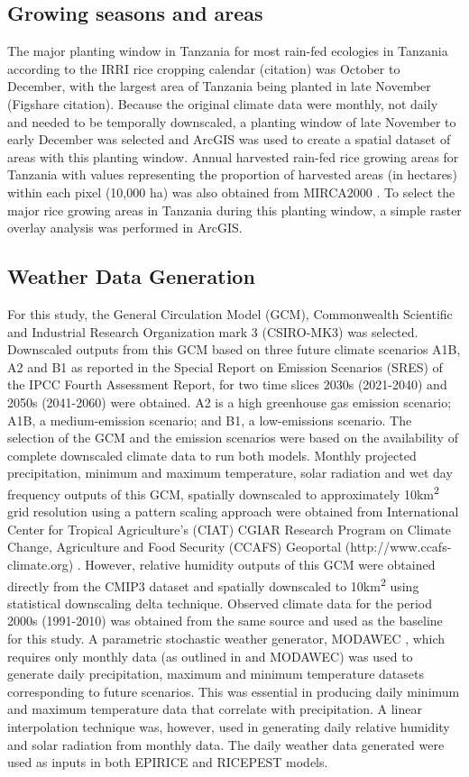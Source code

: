 \documentclass[preprint,12pt]{elsarticle}
\begin{document}
\subsection{Growing seasons and areas}
The major planting window in Tanzania for most rain-fed ecologies in Tanzania according to the IRRI rice cropping calendar (citation) was October to December, with the largest area of Tanzania being planted in late November (Figshare citation). Because the original climate data were monthly, not daily and needed to be temporally downscaled, a planting window of late November to early December was selected and ArcGIS was used to create a spatial dataset of areas with this planting window. Annual harvested rain-fed rice growing areas for Tanzania with values representing the proportion of harvested areas (in hectares) within each pixel (10,000 ha) was also obtained from MIRCA2000 \cite{Portmann2010}. To select the major rice growing areas in Tanzania during this planting window, a simple raster overlay analysis was performed in ArcGIS.

\subsection{Weather Data Generation}
For this study, the General Circulation Model (GCM), Commonwealth Scientific and Industrial Research Organization mark 3 (CSIRO-MK3) was selected. Downscaled outputs from this GCM based on three future climate scenarios A1B, A2 and B1 as reported in the Special Report on Emission Scenarios (SRES) of the IPCC Fourth Assessment Report, for two time slices 2030s (2021-2040) and 2050s (2041-2060) were obtained. A2 is a high greenhouse gas emission scenario; A1B, a medium-emission scenario; and B1, a low-emissions scenario. The selection of the GCM and the emission scenarios were based on the availability of complete downscaled climate data to run both models. Monthly projected precipitation, minimum and maximum temperature, solar radiation and wet day frequency outputs of this GCM, spatially downscaled to approximately 10km\textsuperscript{2} grid resolution using a pattern scaling approach were obtained from International Center for Tropical Agriculture's (CIAT) CGIAR Research Program on Climate Change, Agriculture and Food Security (CCAFS) Geoportal (http://www.ccafs-climate.org) \cite{Jones2009}. However, relative humidity outputs of this GCM were obtained directly from the CMIP3 dataset and spatially downscaled to 10km\textsuperscript{2} using statistical downscaling delta technique. Observed climate data for the period 2000s (1991-2010) was obtained from the same source and used as the baseline for this study. A parametric stochastic weather generator, MODAWEC \cite{Liu2009}, which requires only monthly data (as outlined in \citet{Geng1986} and MODAWEC) was used to generate daily precipitation, maximum and minimum temperature datasets corresponding to future scenarios. This was essential in producing daily minimum and maximum temperature data that correlate with precipitation. A linear interpolation technique was, however, used in generating daily relative humidity and solar radiation from monthly data. The daily weather data generated were used as inputs in both EPIRICE and RICEPEST models.
\end{document}
